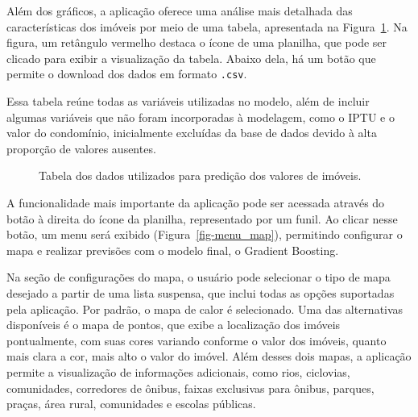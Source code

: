 \documentclass[
  12pt,
  a4paper,
]{scrreprt}
\begin{document}
\vspace{12pt}

Além dos gráficos, a aplicação oferece uma análise mais detalhada das
características dos imóveis por meio de uma tabela, apresentada na
Figura~\ref{fig-table_app}. Na figura, um retângulo vermelho destaca o
ícone de uma planilha, que pode ser clicado para exibir a visualização
da tabela. Abaixo dela, há um botão que permite o download dos dados em
formato \texttt{.csv}.

\vspace{12pt}

Essa tabela reúne todas as variáveis utilizadas no modelo, além de
incluir algumas variáveis que não foram incorporadas à modelagem, como o
IPTU e o valor do condomínio, inicialmente excluídas da base de dados
devido à alta proporção de valores ausentes.

\begin{figure}


\caption{\label{fig-table_app}Tabela dos dados utilizados para predição
dos valores de imóveis.}

\end{figure}%

A funcionalidade mais importante da aplicação pode ser acessada através
do botão à direita do ícone da planilha, representado por um funil. Ao
clicar nesse botão, um menu será exibido (Figura~\ref{fig-menu_map}),
permitindo configurar o mapa e realizar previsões com o modelo final, o
Gradient Boosting.

\vspace{12pt}

Na seção de configurações do mapa, o usuário pode selecionar o tipo de
mapa desejado a partir de uma lista suspensa, que inclui todas as opções
suportadas pela aplicação. Por padrão, o mapa de calor é selecionado.
Uma das alternativas disponíveis é o mapa de pontos, que exibe a
localização dos imóveis pontualmente, com suas cores variando conforme o
valor dos imóveis, quanto mais clara a cor, mais alto o valor do imóvel.
Além desses dois mapas, a aplicação permite a visualização de
informações adicionais, como rios, ciclovias, comunidades, corredores de
ônibus, faixas exclusivas para ônibus, parques, praças, área rural,
comunidades e escolas públicas.
\end{document}
